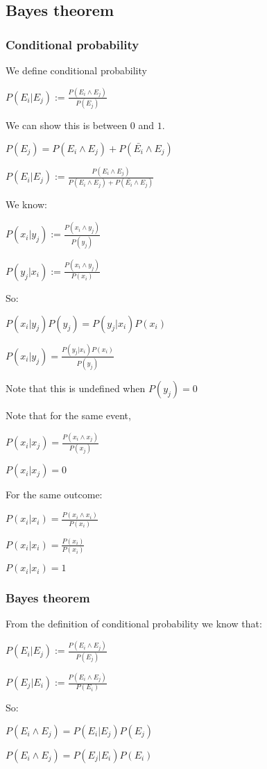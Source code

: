 
\subsection{Bayes theorem}

\subsubsection{Conditional probability}

We define conditional probability

$P(E_i|E_j):=\frac{P(E_i\land E_j)}{P(E_j)}$

We can show this is between \(0\) and \(1\).

$P(E_j)=P(E_i\land E_j)+P(\bar{E_i}\land E_j)$

$P(E_i|E_j):=\frac{P(E_i\land E_j)}{ P(E_i\land E_j)+P(\bar{E_i}\land E_j)}$

We know:

$P(x_i|y_j):=\frac{P(x_i \land y_j)}{P(y_j)}$

$P(y_j|x_i):=\frac{P(x_i \land y_j)}{P(x_i)}$

So:

$P(x_i|y_j)P(y_j)=P(y_j|x_i) P(x_i)$

$P(x_i|y_j)=\frac{P(y_j|x_i) P(x_i)}{P(y_j)}$

Note that this is undefined when \(P(y_j)=0\)

Note that for the same event, 

$P(x_i|x_j)=\frac{P(x_i\land x_j)}{P(x_j)}$

$P(x_i|x_j)=0$

For the same outcome:

$P(x_i|x_i)=\frac{P(x_i\land x_i)}{P(x_i)}$

$P(x_i|x_i)=\frac{P(x_i)}{P(x_i)}$

$P(x_i|x_i)=1$

\subsubsection{Bayes theorem}

From the definition of conditional probability we know that:

$P(E_i|E_j):=\frac{P(E_i\land E_j)}{P(E_j)}$

$P(E_j|E_i):=\frac{P(E_i\land E_j)}{P(E_i)}$

So:

$P(E_i\land E_j)=P(E_i|E_j)P(E_j)$

$P(E_i\land E_j)=P(E_j|E_i)P(E_i)$


